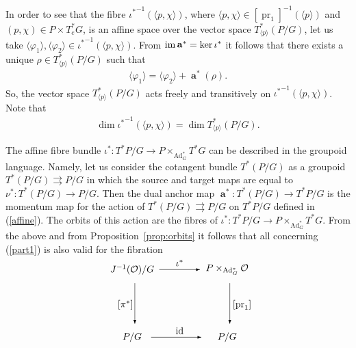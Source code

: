 \documentclass[pdftex]{sigma}
\newcommand{\im}{{\rm im}}
\renewcommand{\O}{\mathcal{O}}
\renewcommand{\to}{\rightarrow}
\newcommand{\tto}{\rightrightarrows}
\DeclareMathOperator{\Ad}{Ad}
\DeclareMathOperator{\anch}{\mathbf{a}}
\newcommand{\id}{\text{\upshape id}}
\numberwithin{equation}{section}
\begin{document}
In order to see that the f\/ibre ${\iota^*}^{-1}(\langle p,\chi\rangle)$, where $\langle p,\chi\rangle \in [\operatorname{pr}_1]^{-1}(\langle p\rangle)$ and $(p,\chi)\in P\times T^*_eG$, is an af\/f\/ine space over the vector space $T^*_{\langle p\rangle}(P/G)$, let us take $\langle \varphi_1\rangle, \langle \varphi_2\rangle\in {\iota^*}^{-1}(\langle p,\chi\rangle )$. From $\im\anch^*=\ker\iota^*$ it follows that there exists a unique $\rho\in T^*_{\langle p\rangle}(P/G)$ such that
\begin{gather}\label{affine} \langle \varphi_1\rangle= \langle \varphi_2\rangle+\anch^*(\rho).\end{gather}
So, the vector space $T^*_{\langle p\rangle}(P/G)$ acts freely and transitively on ${\iota^*}^{-1}(\langle p,\chi\rangle)$. Note that
\begin{gather*} \dim {\iota^*}^{-1}(\langle p,\chi\rangle)=\dim T^*_{\langle p\rangle}(P/G).\end{gather*}

The af\/f\/ine f\/ibre bundle ${\iota^*}\colon T^*P/G\to P\times _{\Ad_G^*}T^*G$ can be described in the groupoid language. Namely, let us consider the cotangent bundle $T^*(P/G)$ as a groupoid $T^*(P/G)\tto P/G$ in which the source and target maps are equal to $\nu^*\colon T^*(P/G)\to P/G$. Then the dual anchor map $\anch^*\colon T^*(P/G)\to T^*P/G$ is the momentum map for the action of $T^*(P/G)\tto P/G$ on $T^*P/G$ def\/ined in (\ref{affine}). The orbits of this action are the f\/ibres of ${\iota^*}\colon T^*P/G\to P\times _{\Ad_G^*}T^*G$. From the above and from Proposition~\ref{prop:orbits} it follows that all
concerning (\ref{part1}) is also valid for the f\/ibration
\begin{gather}\label{part2}
\begin{split}& \unitlength=5mm\begin{picture}(11,5.6)(-1.5,0)
 \put(1,5){\makebox(0,0){$J^{-1}(\O)/G$}}
 \put(8,5){\makebox(0,0){$P\times_{\Ad_G^*}\O$}}
 \put(1,0){\makebox(0,0){$P/G$}}
 \put(8,0){\makebox(0,0){$P/G$}}
 \put(1.2,4){\vector(0,-1){3}}
 \put(8.2,4){\vector(0,-1){3}}
 \put(3,5){\vector(1,0){3}}
 \put(2.4,0){\vector(1,0){3.7}}
 \put(0.5,2.4){\makebox(0,0){$[\pi^*]$}}
 \put(9.1,2.4){\makebox(0,0){$[\operatorname{pr}_1]$}}
 \put(4.5,5.5){\makebox(0,0){$\iota^*$}}
 \put(4.5,0.5){\makebox(0,0){$\id$}}
 \end{picture}\end{split}\end{gather}
\end{document}
